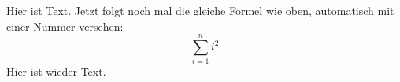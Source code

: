 Hier ist Text. Jetzt folgt 
noch mal die gleiche Formel 
wie oben, automatisch mit 
einer Nummer versehen:
\begin{equation}
	\sum_{i=1}^{n}i^2
\end{equation}
Hier ist wieder Text.